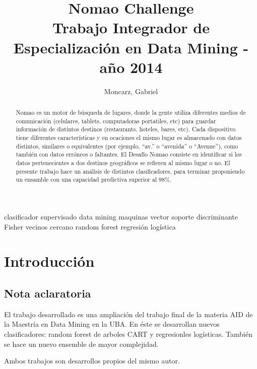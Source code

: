 \documentclass[journal]{IEEEtran}
\begin{document}
\title{  Nomao Challenge \\
	{\large Trabajo Integrador de Especialización en Data Mining - año 2014} \\
} 
\author{Moncarz, Gabriel} 
\maketitle %


\begin{abstract}
Nomao es un motor de búsqueda de lugares, donde la gente utiliza diferentes medios
de comunicación (celulares, tablets, computadoras portatiles, etc) 
para guardar información de distintos destinos (restaurants, hoteles,
bares, etc). Cada dispositivo tiene diferentes características y 
en ocaciones el mismo lugar
es almacenado con datos distintos, similares o equivalentes (por ejemplo, ``av.'' o
``avenida'' o ``Avenue''), como también con datos erróneos o faltantes. 
El Desafío Nomao consiste en identificar si los datos pertenecientes
a dos destinos geográficos se refieren al mismo lugar o no. El presente
trabajo hace un análisis de distintos clasificadores, para terminar
proponiendo un ensamble con una capacidad predictiva superior al 98\%.
\end{abstract}

\begin{IEEEkeywords}
clasificador supervisado data mining maquinas vector soporte
discriminante Fisher vecinos cercano random forest
regresión logística
\end{IEEEkeywords}


\section{Introducción}

\subsection{Nota aclaratoria}
El trabajo desarrollado es una ampliación del trabajo final de la materia
AID de la Maestría en Data Mining en la UBA. En éste se desarrollan nuevos
clasificadores: random forest de arboles CART y regresionles logísticas.
También se hace un nuevo ensemble de mayor complejidad.

Ambos trabajos son desarrollos propios del mismo autor.
\end{document}
